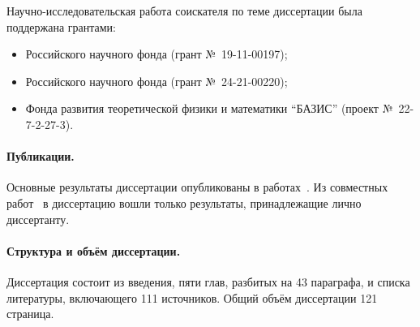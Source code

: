 Научно-исследовательская работа соискателя по теме диссертации была поддержана грантами:
\begin{itemize}
	\item
		Российского научного фонда (грант №~19-11-00197);
	\item
		Российского научного фонда (грант №~24-21-00220);
	\item
		Фонда развития теоретической физики и математики ``БАЗИС'' (проект №~22-7-2-27-3).
\end{itemize}

\paragraph{Публикации.}
Основные результаты диссертации опубликованы в работах~.
Из совместных работ~
в диссертацию вошли только результаты, принадлежащие лично диссертанту.

\paragraph{Структура и объём диссертации.}
Диссертация состоит из введения, пяти глав, разбитых на 43 параграфа,
и списка литературы, включающего 111 источников.
Общий объём диссертации 121 страница.
